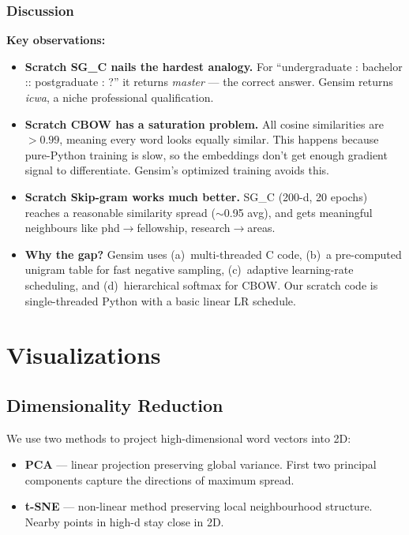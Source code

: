 \documentclass[11pt,a4paper]{article}
\begin{document}
\subsubsection*{Discussion}

\begin{notebox}
\textbf{Key observations:}
\end{notebox}

\begin{itemize}[leftmargin=1.5em]
  \item \textbf{Scratch SG\_C nails the hardest analogy.} For ``undergraduate : bachelor :: postgraduate : ?'' it returns \textit{master} --- the correct answer. Gensim returns \textit{icwa}, a niche professional qualification.
  \item \textbf{Scratch CBOW has a saturation problem.} All cosine similarities are $> 0.99$, meaning every word looks equally similar. This happens because pure-Python training is slow, so the embeddings don't get enough gradient signal to differentiate. Gensim's optimized training avoids this.
  \item \textbf{Scratch Skip-gram works much better.} SG\_C (200-d, 20 epochs) reaches a reasonable similarity spread ($\sim$0.95 avg), and gets meaningful neighbours like phd$\to$fellowship, research$\to$areas.
  \item \textbf{Why the gap?} Gensim uses (a)~multi-threaded C code, (b)~a pre-computed unigram table for fast negative sampling, (c)~adaptive learning-rate scheduling, and (d)~hierarchical softmax for CBOW. Our scratch code is single-threaded Python with a basic linear LR schedule.
\end{itemize}

\section{Visualizations}

\subsection{Dimensionality Reduction}

We use two methods to project high-dimensional word vectors into 2D:

\begin{itemize}[leftmargin=1.5em]
  \item \textbf{PCA} --- linear projection preserving global variance. First two principal components capture the directions of maximum spread.
  \item \textbf{t-SNE} --- non-linear method preserving local neighbourhood structure. Nearby points in high-d stay close in 2D.
\end{itemize}
\end{document}
